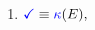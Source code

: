 \begin{multicols}{2}
\begin{enumerate}[topsep=0pt,label=(\textsc{w}\arabic*),ref=\textsc{w}\arabic*]
  \item \label {write-term-ca-addr}
    \begin{math}
      \aTerm \riff
      \kappaE{},

\end{math}
\end{enumerate}
\end{multicols}
